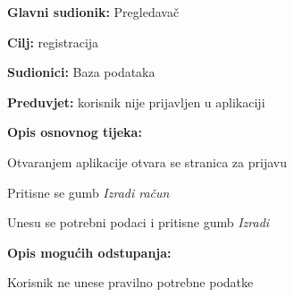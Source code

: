 					\noindent {}
					\begin{packed_item}
						
						\item \textbf{Glavni sudionik: }Pregledavač
						\item  \textbf{Cilj:} registracija
						\item  \textbf{Sudionici:}
						Baza podataka
						\item  \textbf{Preduvjet:} korisnik nije prijavljen u aplikaciji
						\item  \textbf{Opis osnovnog tijeka:}
						
						\item[] \begin{packed_enum}
							
							\item	Otvaranjem aplikacije otvara se stranica za prijavu
							\item	Pritisne se gumb \textit{Izradi račun}
							\item	Unesu se potrebni podaci i pritisne gumb \textit{Izradi}
							
						\end{packed_enum}
						
						\item  \textbf{Opis mogućih odstupanja:}
						
						\item[] \begin{packed_item}
							
							\item[3.a] Korisnik ne unese pravilno potrebne podatke
							
						\end{packed_item}
					\end{packed_item}
					
